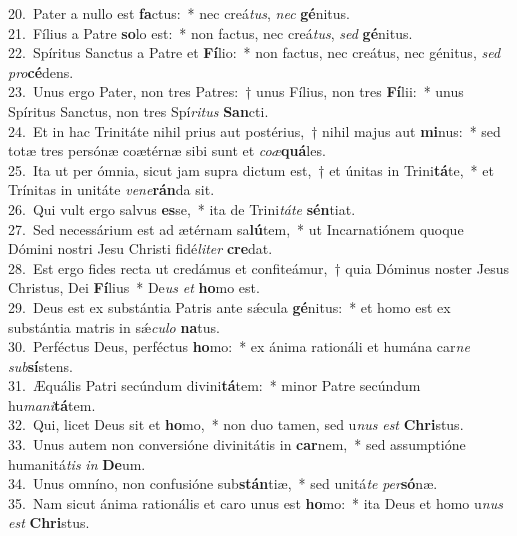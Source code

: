 {20.~}Pater a nullo est \textbf{fa}ctus:~* nec creá\textit{tus}, \textit{nec} \textbf{gé}nitus.\\
{21.~}Fílius a Patre \textbf{so}lo est:~* non factus, nec creá\textit{tus}, \textit{sed} \textbf{gé}nitus.\\
{22.~}Spíritus Sanctus a Patre et \textbf{Fí}lio:~* non factus, nec creátus, nec génitus, \textit{sed} \textit{pro}\textbf{cé}dens.\\
{23.~}Unus ergo Pater, non tres Patres:~† unus Fílius, non tres \textbf{Fí}lii:~* unus Spíritus Sanctus, non tres Spí\textit{ri}\textit{tus} \textbf{San}cti.\\
{24.~}Et in hac Trinitáte nihil prius aut postérius,~† nihil majus aut \textbf{mi}nus:~* sed totæ tres persónæ coætérnæ sibi sunt et \textit{co}\textit{æ}\textbf{quá}les.\\
{25.~}Ita ut per ómnia, sicut jam supra dictum est,~† et únitas in Trini\textbf{tá}te,~* et Trínitas in unitáte \textit{ve}\textit{ne}\textbf{rán}da sit.\\
{26.~}Qui vult ergo salvus \textbf{es}se,~* ita de Trini\textit{tá}\textit{te} \textbf{sén}tiat.\\
{27.~}Sed necessárium est ad ætérnam sa\textbf{lú}tem,~* ut Incarnatiónem quoque Dómini nostri Jesu Christi fidé\textit{li}\textit{ter} \textbf{cre}dat.\\
{28.~}Est ergo fides recta ut credámus et confiteámur,~† quia Dóminus noster Jesus Christus, Dei \textbf{Fí}lius~* De\textit{us} \textit{et} \textbf{ho}mo est.\\
{29.~}Deus est ex substántia Patris ante sǽcula \textbf{gé}nitus:~* et homo est ex substántia matris in sǽ\textit{cu}\textit{lo} \textbf{na}tus.\\
{30.~}Perféctus Deus, perféctus \textbf{ho}mo:~* ex ánima rationáli et humána car\textit{ne} \textit{sub}\textbf{sí}stens.\\
{31.~}Æquális Patri secúndum divini\textbf{tá}tem:~* minor Patre secúndum hu\textit{ma}\textit{ni}\textbf{tá}tem.\\
{32.~}Qui, licet Deus sit et \textbf{ho}mo,~* non duo tamen, sed u\textit{nus} \textit{est} \textbf{Chri}stus.\\
{33.~}Unus autem non conversióne divinitátis in \textbf{car}nem,~* sed assumptióne humanitá\textit{tis} \textit{in} \textbf{De}um.\\
{34.~}Unus omníno, non confusióne sub\textbf{stán}tiæ,~* sed unitá\textit{te} \textit{per}\textbf{só}næ.\\
{35.~}Nam sicut ánima rationális et caro unus est \textbf{ho}mo:~* ita Deus et homo u\textit{nus} \textit{est} \textbf{Chri}stus.\\
